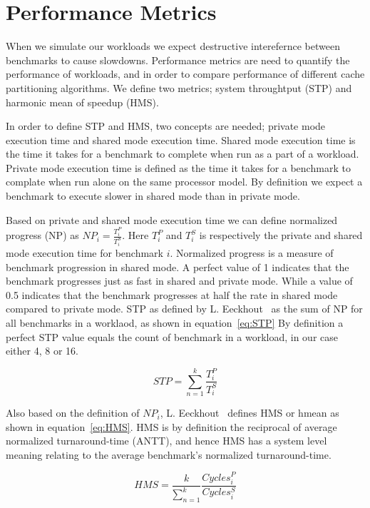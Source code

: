\section{Performance Metrics}
\label{sec:methodology:metrics}

When we simulate our workloads we expect destructive interefernce between benchmarks to cause slowdowns.
Performance metrics are need to quantify the performance of workloads, and in order to compare performance of different cache partitioning algorithms.
We define two metrics; system throughtput (STP) and harmonic mean of speedup (HMS).

In order to define STP and HMS, two concepts are needed; private mode execution time and shared mode execution time.
Shared mode execution time is the time it takes for a benchmark to complete when run as a part of a workload.
Private mode execution time is defined as the time it takes for a benchmark to complate when run alone on the same processor model.
By definition we expect a benchmark to execute slower in shared mode than in private mode.

Based on private and shared mode execution time we can define normalized progress (NP) as $NP_i = \frac{T^{P}_i}{T^{S}_i}$.
Here $T^{P}_i$ and $T^{S}_i$ is respectively the private and shared mode execution time for benchmark $i$.
Normalized progress is a measure of benchmark progression in shared mode.
A perfect value of 1 indicates that the benchmark progresses just as fast in shared and private mode.
While a value of 0.5 indicates that the benchmark progresses at half the rate in shared mode compared to private mode.
STP as defined by L. Eeckhout~\cite{Eeckhout2010} as the sum of NP for all benchmarks in a worklaod, as shown in equation~\ref{eq:STP}
By definition a perfect STP value equals the count of benchmark in a workload, in our case either 4, 8 or 16.

\begin{equation} \label{eq:STP} 
 STP = {\sum\limits_{n=1}^{k}}\frac{T^{P}_i}{T^{S}_i}
\end{equation}

Also based on the definition of $NP_i$, L. Eeckhout~\cite{Eeckhout2010} defines HMS or hmean as shown in equation~\ref{eq:HMS}.
HMS is by definition the reciprocal of average normalized turnaround-time (ANTT), and hence HMS has a system level meaning relating to the average benchmark's normalized turnaround-time.

\begin{equation} \label{eq:HMS}
 HMS = \frac{k}{\sum\limits_{n=1}^{k}}\frac{Cycles^{P}_i}{Cycles^{S}_i}
\end{equation}

